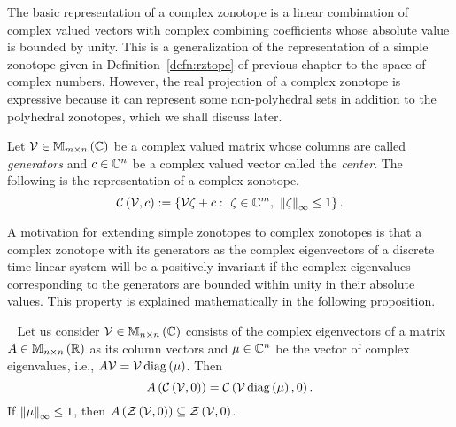 The basic representation of a complex zonotope is a linear combination
of complex valued vectors with complex combining coefficients whose
absolute value is bounded by unity.  This is a generalization of the
representation of a simple zonotope given in Definition~\ref{defn:rztope} of
previous chapter to the space of complex numbers.  However, the real
projection of a complex zonotope is expressive because it can
represent some non-polyhedral sets in addition to the polyhedral
zonotopes, which we shall discuss later.
%
\begin{definition}
Let $\mathcal{V}\in\mathbb{M}_{m\times n}\left(\mathbb{C}\right)$ be a complex valued matrix
whose columns are called {\it generators} and $c\in\mathbb{C}^n$ be a
complex valued vector called the {\it center}.  The following is the
representation of a
complex zonotope.
%
\begin{equation}
\mathit{\mathcal{C}}\left(\mathcal{V},c\right) := \left\{\mathcal{V}\zeta+c:~\zeta\in\mathbb{C}^m,~\left\|\zeta\right\|_{\infty}\leq 1\right\}.
\end{equation}
%
\end{definition}
%
A motivation for extending simple zonotopes to complex zonotopes is
that a complex zonotope with its generators as the complex
eigenvectors of a discrete time linear system will be a positively
invariant if the complex eigenvalues corresponding to the generators
are bounded within unity in their absolute values.  This property is
explained mathematically in the following proposition.
%
\begin{proposition}~\label{lem:eig-invariance}
Let us consider $\mathcal{V}\in\mathbb{M}_{n\times n}\left(\mathbb{C}\right)$ consists
of the complex eigenvectors of a matrix $A\in\mathbb{M}_{n\times n}\left(\mathbb{R}\right)$ as
its column vectors and $\mu\in\mathbb{C}^n$ be the vector of complex
eigenvalues, i.e., $A\mathcal{V}
= \mathcal{V}\operatorname{diag}\left(\mu\right)$.  Then \[A\left(\mathit{\mathcal{C}}\left(\mathcal{V},0\right)\right)
= \mathit{\mathcal{C}}\left(\mathcal{V}\operatorname{diag}\left(\mu\right),0\right).\] If
$\left\|\mu\right\|_{\infty}\leq 1$, then
$A\left(\mathit{\mathcal{Z}}\left(\mathcal{V},0\right)\right)\subseteq \mathit{\mathcal{Z}}\left(\mathcal{V},0\right)$.
\end{proposition}
% 
